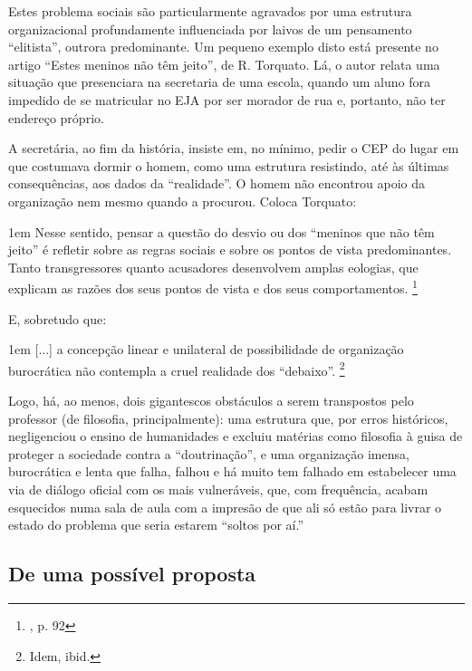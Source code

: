 \documentclass[12pt,a4paper]{article}
\newenvironment{citac}{
	\begin{addmargin}[4cm]{1em} \footnotesize}{\normalfont \end{addmargin}
}
\begin{document}
	Estes problema sociais são particularmente agravados por uma estrutura 
	organizacional profundamente influenciada por laivos de um pensamento 
	“elitista”, outrora predominante. Um pequeno exemplo disto está 
	presente no artigo “Estes meninos não têm jeito”, de R. Torquato. 
	Lá, o autor relata uma situação que presenciara na secretaria de uma 
	escola, quando um aluno fora impedido de se matricular no EJA por 
	ser morador de rua e, portanto, não ter endereço próprio. 

	A secretária, ao fim da história, insiste em, no mínimo, pedir o CEP
	do lugar em que costumava dormir o homem, como uma estrutura 
	resistindo, até às últimas consequências, aos dados da “realidade”. 
	O homem não encontrou apoio da organização nem mesmo quando a 
	procurou. Coloca Torquato: 
	
	\begin{citac}
		Nesse sentido, pensar a questão do desvio
		ou dos “meninos que não têm jeito” é refletir
		sobre as regras sociais e sobre os pontos de
		vista predominantes. Tanto transgressores
		quanto acusadores desenvolvem amplas
		eologias, que explicam as razões dos seus
		pontos de vista e dos seus comportamentos.
		\footnote{\cite{favela}, p. 92}
	\end{citac}

	E, sobretudo que: 

	\begin{citac}
		[...] a concepção linear e unilateral de
		possibilidade de organização burocrática não
		contempla a cruel realidade dos “debaixo”.
		\footnote{Idem, ibid.}
	\end{citac}

	Logo, há, ao menos, dois gigantescos obstáculos a serem transpostos 
	pelo professor (de filosofia, principalmente): uma estrutura que, 
	por erros históricos, negligenciou o ensino de humanidades e excluiu 
	matérias como filosofia à guisa de proteger a sociedade contra a 
	“doutrinação”, e uma organização imensa, burocrática e lenta que 
	falha, falhou e há muito tem falhado em estabelecer uma via de 
	diálogo oficial com os mais vulneráveis, que, com frequência, 
	acabam esquecidos numa sala de aula com a impresão de que ali só estão 
	para livrar o estado do problema que seria estarem “soltos por aí.” 

	\subsection{De uma possível proposta}
	
\end{document}
